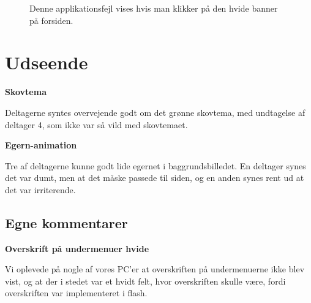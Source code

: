 \documentclass[10pt,a4paper]{article}      %
\newcommand\pic[1]{\texttt{[image: Pics/\#1]}}
\renewcommand\good{\pic{good}}
\renewcommand\smallproblem{\pic{smallproblem}}
\begin{document}
\begin{figure}[htbp]
    \centering
    \caption{Denne applikationsfejl vises hvis man klikker på den hvide banner på forsiden.}
    \label{fig:fejlmeddelelse}
\end{figure}

\section{Udseende}
\begin{kommentarer}
  \item[\good]{\textbf{Skovtema}}
  
  Deltagerne syntes overvejende godt om det grønne skovtema, med
  undtagelse af deltager 4, som ikke var så vild med skovtemaet.

  \item[\smallproblem]{\textbf{Egern-animation}} 
  
  Tre af deltagerne kunne godt lide egernet i baggrundsbilledet. En deltager
  synes det var dumt, men at det måske passede til siden, og en anden synes rent
  ud at det var irriterende.
\end{kommentarer}

\subsection{Egne kommentarer} %
\label{sub:Egne kommentarer udseende}

\begin{kommentarer}
  \item[\smallproblem]{\textbf{Overskrift på undermenuer hvide}}

  Vi oplevede på nogle af vores PC'er at overskriften på undermenuerne ikke blev
  vist, og at der i stedet var et hvidt felt, hvor overskriften skulle være,
  fordi overskriften var implementeret i flash.
\end{kommentarer}
\end{document}
